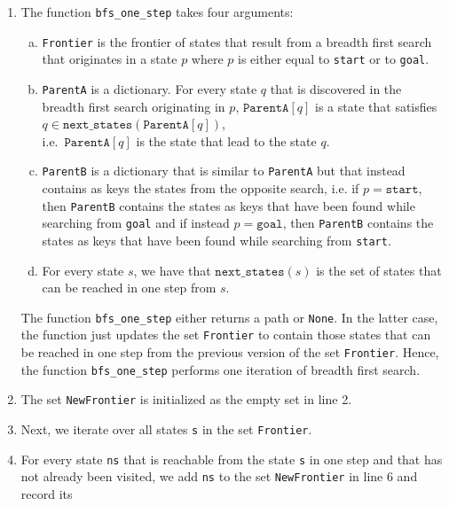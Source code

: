 \begin{enumerate}
\item The function \texttt{bfs\_one\_step} takes four arguments:
      \begin{enumerate}[(a)]
      \item \texttt{Frontier} is the frontier of states that result from a breadth first search
            that originates in a state $p$ where $p$ is either equal to \texttt{start} or to \texttt{goal}.
      \item \texttt{ParentA} is a dictionary.  For every state $q$ that is discovered in the breadth first
            search originating in $p$, $\mathtt{ParentA}[q]$ is a state that satisfies
            \\[0.2cm]
            \hspace*{1.3cm}
            $q \in \mathtt{next\_states}(\mathtt{ParentA}[q])$,
            \\[0.2cm]
            i.e.~$\texttt{ParentA}[q]$ is the state that lead to the state $q$.
      \item \texttt{ParentB} is a dictionary that is similar to \texttt{ParentA} but that instead contains
            as keys the states from the opposite search, i.e. if $p = \mathtt{start}$, then \texttt{ParentB}
            contains the states as keys that have been found while searching from \texttt{goal} and if instead
             $p = \mathtt{goal}$, then \texttt{ParentB} contains the states as keys that have been found while
             searching from \texttt{start}.
      \item For every state $s$, we have that $\texttt{next\_states}(s)$ is the set of states that can be
            reached in one step from $s$.
      \end{enumerate}
      The function \texttt{bfs\_one\_step} either returns a path or \texttt{None}.  In the latter case, the
      function just updates the set \texttt{Frontier} to contain those states that can be
      reached in one step from the previous version of the set \texttt{Frontier}.  Hence, the function
      \texttt{bfs\_one\_step} performs one iteration of breadth first search.
\item The set \texttt{NewFrontier} is initialized as the empty set in line 2.
\item Next, we iterate over all states \texttt{s} in the set \texttt{Frontier}.
\item For every state \texttt{ns} that is reachable from the state \texttt{s} in one step and that has not
      already been visited, we add \texttt{ns} to the set \texttt{NewFrontier} in line 6 and record its

\end{enumerate}
